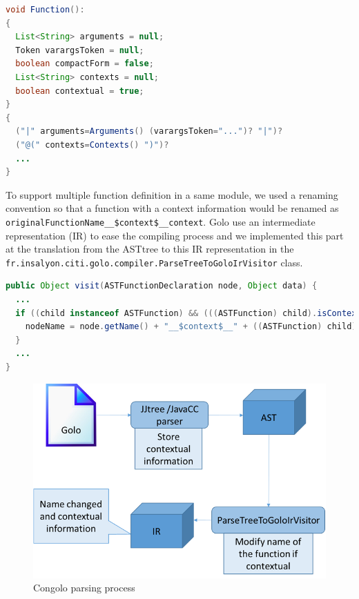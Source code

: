 \documentclass[a4paper]{article}
\begin{document}
\begin{lstlisting}[float, language=Java, caption=Grammar modification - Golo.jjt, label={listing:implgrammar}]
void Function():
{
  List<String> arguments = null;
  Token varargsToken = null;
  boolean compactForm = false;
  List<String> contexts = null;
  boolean contextual = true;
}
{
  ("|" arguments=Arguments() (varargsToken="...")? "|")?
  ("@(" contexts=Contexts() ")")?
  ...
}
\end{lstlisting}

To support multiple function definition in a same module, we used a renaming convention so that a function with a context information would be renamed as \lstinline|originalFunctionName__$context$__context|.  Golo use an intermediate representation (IR) to ease the compiling process and we implemented this part at the translation from the ASTtree to this IR representation in the \lstinline|fr.insalyon.citi.golo.compiler.ParseTreeToGoloIrVisitor| class.

\begin{lstlisting}[float, language=Java, caption=IR modification - ParseTreeToGoloIrVisitor.java, label={listing:implastfunction}]
public Object visit(ASTFunctionDeclaration node, Object data) {
  ...
  if ((child instanceof ASTFunction) && (((ASTFunction) child).isContextual())) {
    nodeName = node.getName() + "__$context$__" + ((ASTFunction) child).getContexts().get(0);
  }
  ...
}
\end{lstlisting}

\begin{center}
\begin{figure}
\centering
\includegraphics[width=0.9\columnwidth]{images/congolo_parse.png}
\caption{Congolo parsing process}
\label{figure:congoloparsing}
\end{figure}
\end{center}
\end{document}
